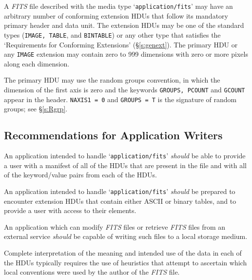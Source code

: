 \documentclass[11pt,makeidx]{book}     %
\begin{document}
  A {\em FITS\/} file described with the media type `{\tt application/fits}' may have
  an arbitrary number of conforming extension HDUs
  that follow its mandatory primary header and data unit.    
  The extension HDUs may be one of the standard types ({\tt IMAGE,
  TABLE}, and {\tt BINTABLE}) or any other type that satisfies the
  `Requirements for Conforming Extensions' (\S\ref{s:genext}).
  The primary HDU or any {\tt IMAGE} extension may contain zero to 999   
  dimensions with zero or more pixels along each dimension.

  The primary HDU may use the random groups convention, in which the dimension
  of the first axis is zero and the keywords {\tt GROUPS, PCOUNT} and {\tt GCOUNT}
  appear in the header.  {\tt NAXIS1 = 0} and {\tt GROUPS = T} is the signature of
  random groups; see \S\ref{s:Rgrp}.

\subsection{Recommendations for Application Writers}

  An application intended to handle `{\tt application/fits}' {\em should} be able
  to provide a user with a manifest of all of the HDUs that are present
  in the file and with all of the keyword/value pairs from each of the
  HDUs.

  An application intended to handle `{\tt application/fits}' {\em should} be
  prepared to encounter extension HDUs that contain either ASCII or binary
  tables, and to provide a user with access to their elements.

  An application which can modify  {\em FITS\/} files or retrieve {\em FITS\/} files
  from an external service {\em should} be capable of writing such files to a
  local storage medium.

  Complete interpretation of the meaning and intended use of the data
  in each of the HDUs typically requires the use of heuristics that
  attempt to ascertain which local conventions were used by the author
  of the {\em FITS\/} file.
\end{document}
